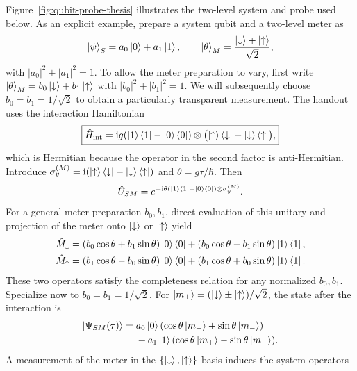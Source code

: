Figure~\ref{fig:qubit-probe-thesis} illustrates the two-level system and probe used below. As an explicit example, prepare a system qubit and a two-level meter as
\begin{equation}
\left|\psi\right\rangle_S=a_0\left|0\right\rangle+a_1\left|1\right\rangle,\qquad
  \left|\theta\right\rangle_M=\frac{\left|\downarrow\right\rangle+\left|\uparrow\right\rangle}{\sqrt2},
\end{equation}
with $|a_0|^2+|a_1|^2=1$. To allow the meter preparation to vary, first write $\left|\theta\right\rangle_M=b_0\left|\downarrow\right\rangle+b_1\left|\uparrow\right\rangle$ with $|b_0|^2+|b_1|^2=1$. We will subsequently choose $b_0=b_1=1/\sqrt2$ to obtain a particularly transparent measurement. The handout uses the interaction Hamiltonian
\begin{equation}
\boxed{\hat{H}_{\mathrm{int}}=\mathrm{i} g(\left|1\right\rangle\left\langle1\right|-\left|0\right\rangle\left\langle0\right|)
 \otimes\bigl(\left|\uparrow\right\rangle\left\langle\downarrow\right|-\left|\downarrow\right\rangle\left\langle\uparrow\right|\bigr),}
\end{equation}
which is Hermitian because the operator in the second factor is anti-Hermitian. Introduce $\sigma_y^{(M)}=\mathrm{i}(\left|\uparrow\right\rangle\left\langle\downarrow\right|-\left|\downarrow\right\rangle\left\langle\uparrow\right|)$ and $\theta=g\tau/\hbar$. Then
\begin{equation}
\hat{U}_{SM}=e^{-\mathrm{i}\theta(\left|1\right\rangle\left\langle1\right|-\left|0\right\rangle\left\langle0\right|)\otimes\sigma_y^{(M)}}.
\end{equation}
For a general meter preparation $b_0,b_1$, direct evaluation of this unitary and projection of the meter onto $\left|\downarrow\right\rangle$ or $\left|\uparrow\right\rangle$ yield
\begin{equation}
\begin{aligned}
\hat{M}_\downarrow&=(b_0\cos\theta+b_1\sin\theta)\left|0\right\rangle\left\langle0\right|
 +(b_0\cos\theta-b_1\sin\theta)\left|1\right\rangle\left\langle1\right|,\\
\hat{M}_\uparrow&=(b_1\cos\theta-b_0\sin\theta)\left|0\right\rangle\left\langle0\right|
 +(b_1\cos\theta+b_0\sin\theta)\left|1\right\rangle\left\langle1\right|.
\end{aligned}
\end{equation}
These two operators satisfy the completeness relation for any normalized $b_0,b_1$. Specialize now to $b_0=b_1=1/\sqrt2$. For $\left|m_\pm\right\rangle=(\left|\downarrow\right\rangle\pm\left|\uparrow\right\rangle)/\sqrt2$, the state after the interaction is
\begin{equation}
\begin{split}
\left|\Psi_{SM}(\tau)\right\rangle={}&a_0\left|0\right\rangle(\cos\theta\left|m_+\right\rangle+\sin\theta\left|m_-\right\rangle)\\
&+a_1\left|1\right\rangle(\cos\theta\left|m_+\right\rangle-\sin\theta\left|m_-\right\rangle).
\end{split}
\end{equation}
A measurement of the meter in the $\{\left|\downarrow\right\rangle,\left|\uparrow\right\rangle\}$ basis induces the system operators
